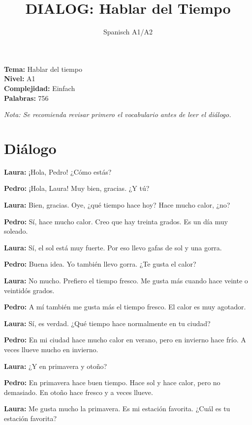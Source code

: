 \documentclass[12pt,a4paper]{article}
\begin{document}
\title{\textbf{DIALOG: Hablar del Tiempo}}
\author{Spanisch A1/A2}
\date{}
\maketitle

\textbf{Tema:} Hablar del tiempo \\
\textbf{Nivel:} A1 \\
\textbf{Complejidad:} Einfach \\
\textbf{Palabras:} 756

\vspace{1em}

\textit{Nota: Se recomienda revisar primero el vocabulario antes de leer el diálogo.}

\vspace{1em}

\section*{Diálogo}

\textbf{Laura:} ¡Hola, Pedro! ¿Cómo estás?

\textbf{Pedro:} ¡Hola, Laura! Muy bien, gracias. ¿Y tú?

\textbf{Laura:} Bien, gracias. Oye, ¿qué tiempo hace hoy? Hace mucho calor, ¿no?

\textbf{Pedro:} Sí, hace mucho calor. Creo que hay treinta grados. Es un día muy soleado.

\textbf{Laura:} Sí, el sol está muy fuerte. Por eso llevo gafas de sol y una gorra.

\textbf{Pedro:} Buena idea. Yo también llevo gorra. ¿Te gusta el calor?

\textbf{Laura:} No mucho. Prefiero el tiempo fresco. Me gusta más cuando hace veinte o veintidós grados.

\textbf{Pedro:} A mí también me gusta más el tiempo fresco. El calor es muy agotador.

\textbf{Laura:} Sí, es verdad. ¿Qué tiempo hace normalmente en tu ciudad?

\textbf{Pedro:} En mi ciudad hace mucho calor en verano, pero en invierno hace frío. A veces llueve mucho en invierno.

\textbf{Laura:} ¿Y en primavera y otoño?

\textbf{Pedro:} En primavera hace buen tiempo. Hace sol y hace calor, pero no demasiado. En otoño hace fresco y a veces llueve.

\textbf{Laura:} Me gusta mucho la primavera. Es mi estación favorita. ¿Cuál es tu estación favorita?
\end{document}
